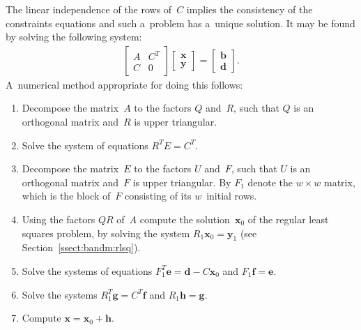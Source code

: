 The linear independence of the rows of~$C$ implies the consistency of
the constraints equations and such a~problem has a~unique solution.
It may be found by solving the following system:
\begin{align*}
  \left[\begin{array}{cc} A & C^T \\ C & 0 \end{array}\right]
  \left[\begin{array}{c} \bm{x} \\ \bm{y} \end{array}\right] =
  \left[\begin{array}{c} \bm{b} \\ \bm{d} \end{array}\right].
\end{align*}
A~numerical method appropriate for doing this follows:
\begin{enumerate}
  \item Decompose the matrix~$A$ to the factors $Q$ and~$R$,
    such that $Q$ is an orthogonal matrix and~$R$ is upper triangular.
  \item Solve the system of equations $R^TE=C^T$.
  \item Decompose the matrix~$E$ to the factors $U$ and~$F$,
    such that $U$ is an orthogonal matrix and~$F$ is upper triangular.
    By $F_1$ denote the $w\times w$ matrix, which is the block of~$F$
    consisting of its $w$~initial rows.
  \item Using the factors $QR$ of~$A$ compute the solution~$\bm{x}_0$
    of the regular least squares problem, by solving the system
    $R_1\bm{x}_0=\bm{y}_1$ (see Section~\ref{ssect:bandm:rlsq}).
  \item Solve the systems of equations $F_1^T\bm{e}=\bm{d}-C\bm{x}_0$ and
    $F_1\bm{f}=\bm{e}$.
  \item Solve the systems $R_1^T\bm{g}=C^T\bm{f}$ and $R_1\bm{h}=\bm{g}$.
  \item Compute $\bm{x}=\bm{x}_0+\bm{h}$.
\end{enumerate}

